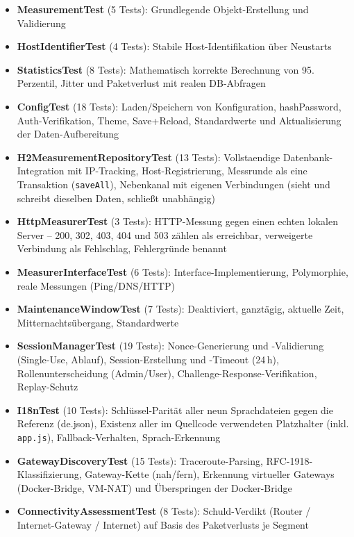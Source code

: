 \begin{itemize}
    \item \textbf{MeasurementTest} (5 Tests): Grundlegende Objekt-Erstellung und Validierung
    \item \textbf{HostIdentifierTest} (4 Tests): Stabile Host-Identifikation über Neustarts
    \item \textbf{StatisticsTest} (8 Tests): Mathematisch korrekte Berechnung von 95. Perzentil, Jitter und Paketverlust mit realen DB-Abfragen
    \item \textbf{ConfigTest} (18 Tests): Laden/Speichern von Konfiguration, hashPassword, Auth-Verifikation, Theme, Save+Reload, Standardwerte und Aktualisierung der Daten-Aufbereitung
    \item \textbf{H2MeasurementRepositoryTest} (13 Tests): Vollstaendige Datenbank-Integration mit IP-Tracking, Host-Registrierung, Messrunde als eine Transaktion (\texttt{saveAll}), Nebenkanal mit eigenen Verbindungen (sieht und schreibt dieselben Daten, schließt unabhängig)
    \item \textbf{HttpMeasurerTest} (3 Tests): HTTP-Messung gegen einen echten lokalen Server -- 200, 302, 403, 404 und 503 zählen als erreichbar, verweigerte Verbindung als Fehlschlag, Fehlergründe benannt
    \item \textbf{MeasurerInterfaceTest} (6 Tests): Interface-Implementierung, Polymorphie, reale Messungen (Ping/DNS/HTTP)
    \item \textbf{MaintenanceWindowTest} (7 Tests): Deaktiviert, ganztägig, aktuelle Zeit, Mitternachtsübergang, Standardwerte
    \item \textbf{SessionManagerTest} (19 Tests): Nonce-Generierung und -Validierung (Single-Use, Ablauf), Session-Erstellung und -Timeout (24\,h), Rollen\-unter\-schei\-dung (Admin/User), Challenge-Response-Verifikation, Replay-Schutz
    \item \textbf{I18nTest} (10 Tests): Schlüssel-Parität aller neun Sprachdateien gegen die Referenz (de.json), Existenz aller im Quellcode verwendeten Platzhalter (inkl. \texttt{app.js}), Fallback-Verhalten, Sprach-Erkennung
    \item \textbf{GatewayDiscoveryTest} (15 Tests): Traceroute-Parsing, RFC-1918-Klassifizierung, Gateway-Kette (nah/fern), Erkennung virtueller Gateways (Docker-Bridge, VM-NAT) und Überspringen der Docker-Bridge
    \item \textbf{ConnectivityAssessmentTest} (8 Tests): Schuld-Verdikt (Router / Internet-Gateway / Internet) auf Basis des Paketverlusts je Segment

\end{itemize}
